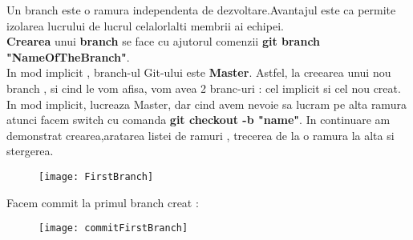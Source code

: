 \tab Un branch este o ramura independenta de dezvoltare.Avantajul este ca permite izolarea lucrului de lucrul celalorlalti membrii ai echipei. \\
\textbf{Crearea} unui \textbf{branch} se face cu ajutorul comenzii \textbf{git branch "NameOfTheBranch"}.\\
In mod implicit , branch-ul Git-ului este \textbf{Master}. Astfel, la creearea unui nou branch , si cind le vom afisa, vom avea 2 branc-uri : cel implicit si cel nou creat. In mod implicit, lucreaza Master, dar cind avem nevoie sa lucram pe alta ramura atunci facem switch cu comanda \textbf{git checkout -b "name"}. In continuare am demonstrat crearea,aratarea listei de ramuri , trecerea de la o ramura la alta si stergerea.\\
\begin{figure}[h]
\centering
\texttt{[image: FirstBranch]}
\end{figure}

\clearpage

Facem commit la primul branch creat : 
\begin{figure}[h]
\centering
\texttt{[image: commitFirstBranch]}
\end{figure}

\clearpage